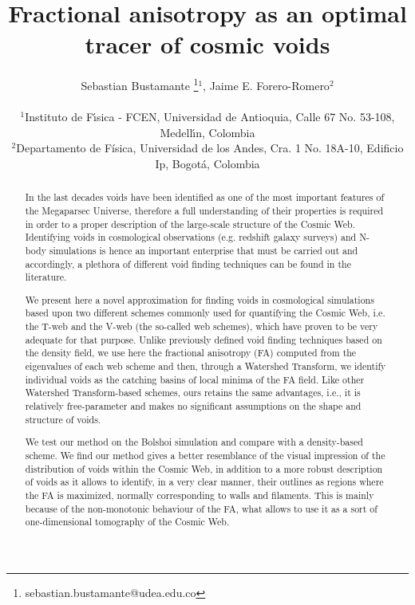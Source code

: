 \documentclass[a4,useAMS,usenatbib,usegraphicx]{latex/mn2e}
\begin{document}
\title{Fractional anisotropy as an optimal tracer of cosmic voids}
\author[S. Bustamante and J.E. Forero-Romero]{
\parbox[t]{\textwidth}{\raggedright 
  Sebastian Bustamante \thanks{sebastian.bustamante@udea.edu.co}$^{1}$,
  Jaime E. Forero-Romero$^{2}$ 
}
\vspace*{6pt}\\
$^1$Instituto de F\'{\i}sica - FCEN, Universidad de Antioquia, Calle
67 No. 53-108, Medell\'{\i}n, Colombia\\ 
$^2$Departamento de F\'{i}sica, Universidad de los Andes, Cra. 1
No. 18A-10, Edificio Ip, Bogot\'a, Colombia
}

\maketitle

\begin{abstract}
In the last decades voids have been identified as one of the most 
important features of the Megaparsec Universe, therefore a full 
understanding of their properties is required in order to a proper 
description of the large-scale structure of the Cosmic Web. Identifying
voids in cosmological observations (e.g. redshift galaxy surveys) and 
N-body simulations is hence an important enterprise that must be carried 
out and accordingly, a plethora of different void finding techniques can 
be found in the literature. 

We present here a novel approximation for finding voids in cosmological 
simulations based upon two different schemes commonly used for quantifying
the Cosmic Web, i.e. the T-web and the V-web (the so-called web schemes), 
which have proven to be very adequate for that purpose. Unlike previously 
defined void finding techniques based on the density field, we use here 
the fractional anisotropy (FA) computed from the eigenvalues of each web 
scheme and then, through a Watershed Transform, we identify individual 
voids as the catching basins of local minima of the FA field. Like other 
Watershed Transform-based schemes, ours retains the same advantages, i.e., 
it is relatively free-parameter and makes no significant assumptions on 
the shape and structure of voids.

We test our method on the Bolshoi simulation and compare with a
density-based scheme. We find our method gives a better resemblance of 
the visual impression of the distribution of voids within the Cosmic Web, 
in addition to a more robust description of voids as it allows to identify,
in a very clear manner, their outlines as regions where the FA is 
maximized, normally corresponding to walls and filaments. This is mainly 
because of the non-monotonic behaviour of the FA, what allows to use it 
as a sort of one-dimensional tomography of the Cosmic Web.

\end{abstract}
\end{document}

